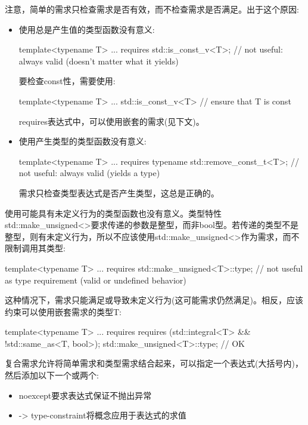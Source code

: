 注意，简单的需求只检查需求是否有效，而不检查需求是否满足。出于这个原因:

\begin{itemize}
\item
使用总是产生值的类型函数没有意义:

\begin{cpp}
template<typename T>
... requires {
	std::is_const_v<T>; // not useful: always valid (doesn’t matter what it yields)
}
\end{cpp}

要检查const性，需要使用:

\begin{cpp}
template<typename T>
... std::is_const_v<T> // ensure that T is const
\end{cpp}

requires表达式中，可以使用嵌套的需求(见下文)。

\item
使用产生类型的类型函数没有意义:

\begin{cpp}
template<typename T>
... requires {
	typename std::remove_const_t<T>; // not useful: always valid (yields a type)
}
\end{cpp}

需求只检查类型表达式是否产生类型，这总是正确的。
\end{itemize}

使用可能具有未定义行为的类型函数也没有意义。类型特性std::make\_unsigned<>要求传递的参数是整型，而非bool型。若传递的类型不是整型，则有未定义行为，所以不应该使用std::make\_unsigned<>作为需求，而不限制调用其类型:

\begin{cpp}
template<typename T>
... requires {
	std::make_unsigned<T>::type; // not useful as type requirement (valid or undefined behavior)
}
\end{cpp}

这种情况下，需求只能满足或导致未定义行为(这可能需求仍然满足)。相反，应该约束可以使用嵌套需求的类型T:

\begin{cpp}
template<typename T>
... requires {
	requires (std::integral<T> && !std::same_as<T, bool>);
	std::make_unsigned<T>::type; // OK
}
\end{cpp}


复合需求允许将简单需求和类型需求结合起来，可以指定一个表达式(大括号内)，然后添加以下一个或两个:

\begin{itemize}
\item
noexcept要求表达式保证不抛出异常

\item
-> type-constraint将概念应用于表达式的求值
\end{itemize}

